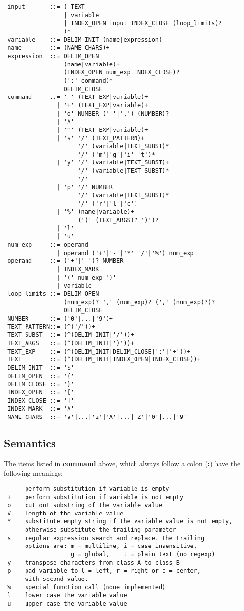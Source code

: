 \footnotesize
\begin{verbatim}
 input       ::= ( TEXT
                 | variable
                 | INDEX_OPEN input INDEX_CLOSE (loop_limits)?
                 )*
 variable    ::= DELIM_INIT (name|expression)
 name        ::= (NAME_CHARS)+
 expression  ::= DELIM_OPEN
                 (name|variable)+
                 (INDEX_OPEN num_exp INDEX_CLOSE)?
                 (':' command)*
                 DELIM_CLOSE
 command     ::= '-' (TEXT_EXP|variable)+
               | '+' (TEXT_EXP|variable)+
               | 'o' NUMBER ('-'|',') (NUMBER)?
               | '#'
               | '*' (TEXT_EXP|variable)+
               | 's' '/' (TEXT_PATTERN)+
                     '/' (variable|TEXT_SUBST)*
                     '/' ('m'|'g'|'i'|'t')*
               | 'y' '/' (variable|TEXT_SUBST)+
                     '/' (variable|TEXT_SUBST)*
                     '/'
               | 'p' '/' NUMBER
                     '/' (variable|TEXT_SUBST)*
                     '/' ('r'|'l'|'c')
               | '%' (name|variable)+
                     ('(' (TEXT_ARGS)? ')')?
               | 'l'
               | 'u'
 num_exp     ::= operand
               | operand ('+'|'-'|'*'|'/'|'%') num_exp
 operand     ::= ('+'|'-')? NUMBER
               | INDEX_MARK
               | '(' num_exp ')'
               | variable
 loop_limits ::= DELIM_OPEN
                 (num_exp)? ',' (num_exp)? (',' (num_exp)?)?
                 DELIM_CLOSE
 NUMBER      ::= ('0'|...|'9')+
 TEXT_PATTERN::= (^('/'))+
 TEXT_SUBST  ::= (^(DELIM_INIT|'/'))+
 TEXT_ARGS   ::= (^(DELIM_INIT|')'))+
 TEXT_EXP    ::= (^(DELIM_INIT|DELIM_CLOSE|':'|'+'))+
 TEXT        ::= (^(DELIM_INIT|INDEX_OPEN|INDEX_CLOSE))+
 DELIM_INIT  ::= '$'
 DELIM_OPEN  ::= '{'
 DELIM_CLOSE ::= '}'
 INDEX_OPEN  ::= '['
 INDEX_CLOSE ::= ']'
 INDEX_MARK  ::= '#'
 NAME_CHARS  ::= 'a'|...|'z'|'A'|...|'Z'|'0'|...|'9'
\end{verbatim}
\normalsize

\subsection*{Semantics}

The items listed in {\bf command} above, which always follow a colon ({\bf :})
have the following meanings: 

\footnotesize
\begin{verbatim}
 -    perform substitution if variable is empty
 +    perform substitution if variable is not empty
 o    cut out substring of the variable value
 #    length of the variable value
 *    substitute empty string if the variable value is not empty,
      otherwise substitute the trailing parameter
 s    regular expression search and replace. The trailing
      options are: m = multiline, i = case insensitive,
                   g = global,    t = plain text (no regexp)
 y    transpose characters from class A to class B
 p    pad variable to l = left, r = right or c = center,
      with second value.
 %    special function call (none implemented)
 l    lower case the variable value
 u    upper case the variable value
\end{verbatim}
\normalsize


